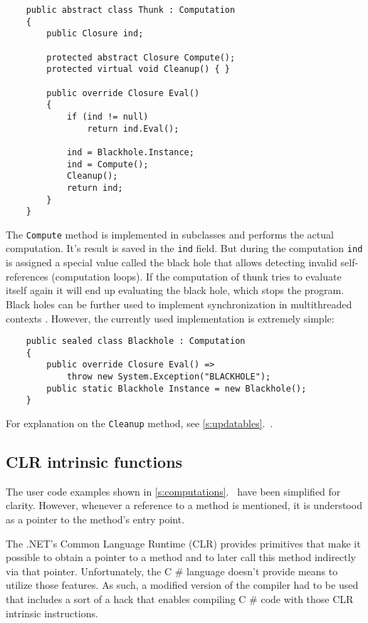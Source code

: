 \documentclass[en]{pracamgr}
\newcommand{\shrp}{%
  {\fontfamily{ppl}\selectfont\#%
  }}
\newcommand{\myref}[1]{\ref{#1}.~\textit{\nameref{#1}}}
\begin{document}
\newpage
\begin{verbatim}
    public abstract class Thunk : Computation
    {
        public Closure ind;

        protected abstract Closure Compute();
        protected virtual void Cleanup() { }
        
        public override Closure Eval()
        {
            if (ind != null) 
                return ind.Eval();

            ind = Blackhole.Instance;
            ind = Compute();
            Cleanup();
            return ind;
        }
    }
\end{verbatim}

The \texttt{Compute} method is implemented in subclasses
and performs the actual computation.
It's result is saved in the \texttt{ind} field.
But during the computation \texttt{ind} is assigned a special
value called the black hole that allows detecting
invalid self-references (computation loops).
If the computation of thunk tries to evaluate itself
again it will end up evaluating the black hole, which stops
the program. Black holes can
be further used to implement synchronization in
multithreaded contexts \cite{multiprocessor}.
However, the currently used implementation is extremely simple:

\begin{verbatim}
    public sealed class Blackhole : Computation
    {
        public override Closure Eval() =>
            throw new System.Exception("BLACKHOLE");
        public static Blackhole Instance = new Blackhole();
    }
\end{verbatim}

For explanation on the \texttt{Cleanup} method, see \myref{s:updatables}.

\subsection{CLR intrinsic functions}

The user code examples shown in \myref{s:computations}
have been simplified for clarity. However,
whenever a reference to a method is mentioned, it is
understood as a pointer to the method's entry point.

The .NET's Common Language Runtime (CLR) provides primitives
that make it possible to obtain a pointer to a method
and to later call this method indirectly via that pointer.
Unfortunately, the C\shrp{} language doesn't provide means to
utilize those features. As such, a modified version of the compiler
had to be used that includes a sort of a hack that
enables compiling C\shrp{} code with those CLR intrinsic instructions.
\end{document}
